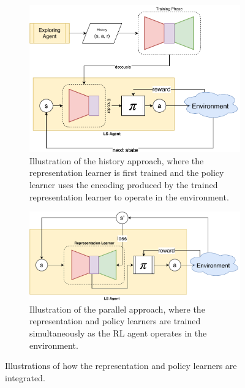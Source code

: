 \begin{figure}[ht!]
	\centering
	\begin{subfigure}{\columnwidth}
		\centering
		\includegraphics[width=\linewidth]{img/history.pdf}
		\caption{Illustration of the history approach, where the representation learner is first trained and the policy learner uses the encoding produced by the trained representation learner to operate in the environment.}
		\label{subfig:approach_history}
	\end{subfigure}%
	
	\begin{subfigure}{\columnwidth}
		\centering
		\includegraphics[width=\linewidth]{img/parallel.pdf}
		\caption{Illustration of the parallel approach, where the representation and policy learners are trained simultaneously as the RL agent operates in the environment.}
		\label{subfig:approach_parallel}
	\end{subfigure}
	\caption{Illustrations of how the representation and policy learners are integrated.
	}
	\label{fig:approaches}
\end{figure}

